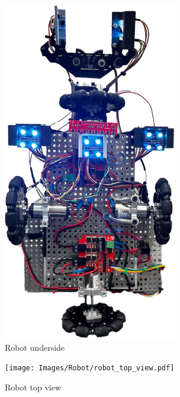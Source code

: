 \documentclass[12pt]{report}
\begin{document}
\begin{figure}[H]
    \centering
    \includegraphics[width=0.68\textwidth]{Images/Robot/robot_underside.pdf}
    \caption{Robot underside}
    \label{fig:underside}
\end{figure}

\begin{figure}[H]
    \centering
    \texttt{[image: Images/Robot/robot\_top\_view.pdf]}
    \caption{Robot top view}
    \label{fig:topview}
\end{figure}
\end{document}
